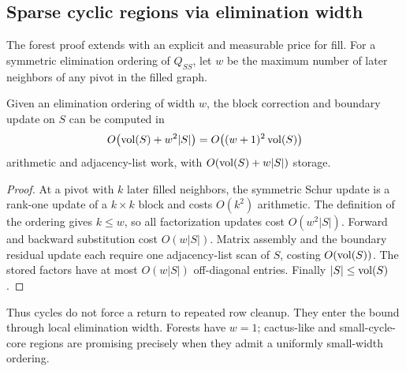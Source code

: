 \subsection{Sparse cyclic regions via elimination width}

The forest proof extends with an explicit and measurable price for fill.
For a symmetric elimination ordering of $Q_{SS}$, let $w$ be the maximum
number of later neighbors of any pivot in the filled graph.

\begin{theorem}
\label{thm:width-resolution}
Given an elimination ordering of width $w$, the block correction and boundary
update on $S$ can be computed in
\begin{equation}
 O\bigl(\operatorname{vol}(S)+w^2|S|\bigr)
 =O\bigl((w+1)^2\operatorname{vol}(S)\bigr)
 \label{eq:width-resolution-work}
\end{equation}
arithmetic and adjacency-list work, with $O(\operatorname{vol}(S)+w|S|)$ storage.
\end{theorem}

\begin{proof}
At a pivot with $k$ later filled neighbors, the symmetric Schur update is a
rank-one update of a $k\times k$ block and costs $O(k^2)$ arithmetic.  The
definition of the ordering gives $k\leq w$, so all factorization updates cost
$O(w^2|S|)$.  Forward and backward substitution cost $O(w|S|)$.  Matrix
assembly and the boundary residual update each require one adjacency-list
scan of $S$, costing $O(\operatorname{vol}(S))$.  The stored factors have at most
$O(w|S|)$ off-diagonal entries.  Finally $|S|\leq\operatorname{vol}(S)$.
\end{proof}

Thus cycles do not force a return to repeated row cleanup.  They enter the
bound through local elimination width.  Forests have $w=1$; cactus-like and
small-cycle-core regions are promising precisely when they admit a uniformly
small-width ordering.
